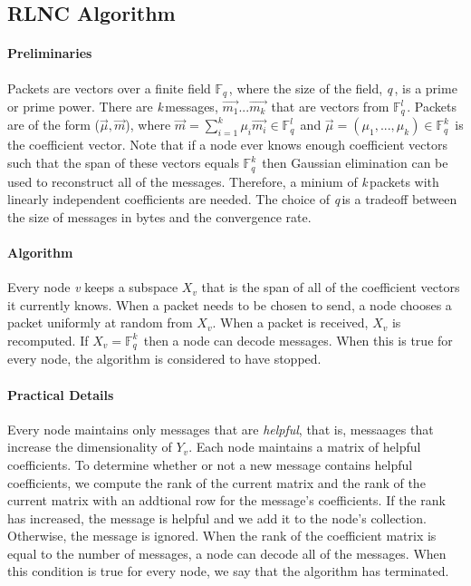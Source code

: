 \documentclass{article} %
\def\numMessages{\textit{k}\,}
\def\fieldSize{\textit{q}\,}
\begin{document}
\subsection{RLNC Algorithm}\label{subsec:RLNC}
\paragraph{Preliminaries}
Packets are vectors over a finite field $\mathbb{F}_{\fieldSize}$, where the size of the field, \fieldSize, is a prime or prime power. There are \numMessages messages, $\vec{m_{1}}...\vec{m_{\numMessages}}$ that are vectors from $\mathbb{F}_{\fieldSize}^{l}$. Packets are of the form ($\vec{\mu}, \vec{m}$), where $\vec{m} = \sum_{i=1}^{\numMessages} \mu_i\vec{m_i} \in \mathbb{F}_{\fieldSize}^{l}$ and $\vec{\mu} = (\mu_1,...,\mu_k) \in \mathbb{F}_{\fieldSize}^{\numMessages}$ is the coefficient vector. Note that if a node ever knows enough coefficient vectors such that the span of these vectors equals $\mathbb{F}_{\fieldSize}^{\numMessages}$ then Gaussian elimination can be used to reconstruct all of the messages. Therefore, a minium of \numMessages packets with linearly independent coefficients are needed. The choice of \fieldSize is a tradeoff between the size of messages in bytes and the convergence rate. 
\paragraph{Algorithm}
Every node \textit{v} keeps a subspace $X_v$ that is the span of all of the coefficient vectors it currently knows. When a packet needs to be chosen to send, a node chooses a packet uniformly at random from $X_v$. When a packet is received, $X_v$ is recomputed. If $X_v = \mathbb{F}_{\fieldSize}^{\numMessages}$ then a node can decode messages. When this is true for every node, the algorithm is considered to have stopped. 
\paragraph{Practical Details}
Every node maintains only messages that are \textit{helpful}, that is, messaages that increase the dimensionality of $Y_v$. Each node maintains a matrix of helpful coefficients. To determine whether or not a new message contains helpful coefficients, we compute the rank of the current matrix and the rank of the current matrix with an addtional row for the message's coefficients. If the rank has increased, the message is helpful and we add it to the node's collection. Otherwise, the message is ignored. When the rank of the coefficient matrix is equal to the number of messages, a node can decode all of the messages. When this condition is true for every node, we say that the algorithm has terminated.
\end{document}
